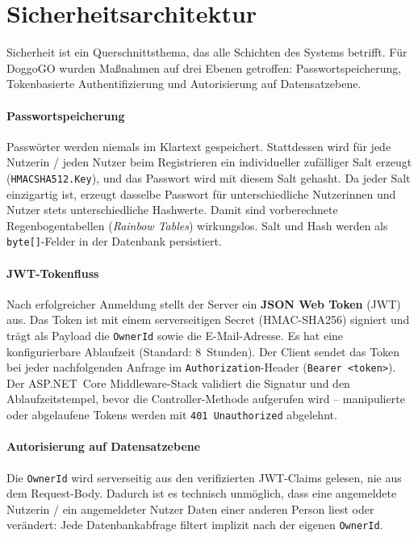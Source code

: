 \section{Sicherheitsarchitektur}
\label{sec:sicherheit}

Sicherheit ist ein Querschnittsthema, das alle Schichten des Systems betrifft. Für DoggoGO
wurden Maßnahmen auf drei Ebenen getroffen: Passwortspeicherung, Tokenbasierte
Authentifizierung und Autorisierung auf Datensatzebene.

\paragraph{Passwortspeicherung}
Passwörter werden niemals im Klartext gespeichert. Stattdessen wird für jede Nutzerin /
jeden Nutzer beim Registrieren ein individueller zufälliger Salt erzeugt
(\texttt{HMACSHA512.Key}), und das Passwort wird mit diesem Salt gehasht. Da jeder Salt
einzigartig ist, erzeugt dasselbe Passwort für unterschiedliche Nutzer\-innen und Nutzer
stets unterschiedliche Hashwerte. Damit sind vorberechnete Regenbogentabellen
(\emph{Rainbow Tables}) wirkungslos. Salt und Hash werden als \texttt{byte[]}-Felder in
der Datenbank persistiert.

\paragraph{JWT-Tokenfluss}
Nach erfolgreicher Anmeldung stellt der Server ein \textbf{JSON Web Token} (JWT) aus.
Das Token ist mit einem serverseitigen Secret (HMAC-SHA256) signiert und trägt als
Payload die \texttt{OwnerId} sowie die E-Mail-Adresse. Es hat eine konfigurierbare
Ablaufzeit (Standard: 8~Stunden). Der Client sendet das Token bei jeder nachfolgenden
Anfrage im \texttt{Authorization}-Header (\texttt{Bearer <token>}). Der ASP.NET~Core
Middleware-Stack validiert die Signatur und den Ablaufzeitstempel, bevor die
Controller-Methode aufgerufen wird – manipulierte oder abgelaufene Tokens werden mit
\texttt{401~Unauthorized} abgelehnt.

\paragraph{Autorisierung auf Datensatzebene}
Die \texttt{OwnerId} wird serverseitig aus den verifizierten JWT-Claims gelesen, nie aus
dem Request-Body. Dadurch ist es technisch unmöglich, dass eine angemeldete Nutzerin /
ein angemeldeter Nutzer Daten einer anderen Person liest oder verändert: Jede Datenbankabfrage
filtert implizit nach der eigenen \texttt{OwnerId}.


